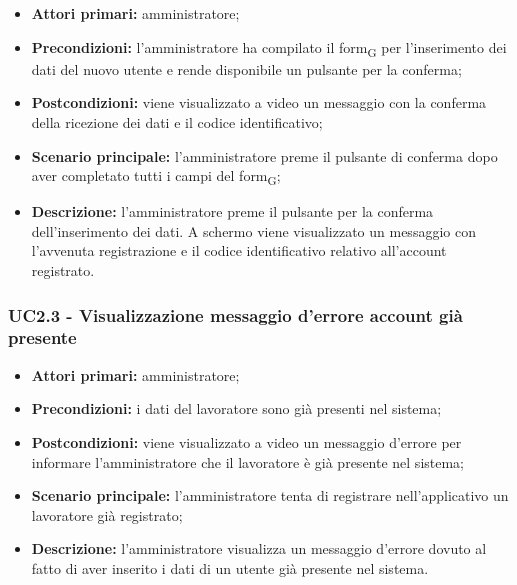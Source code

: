 \begin{itemize}
	\item 	\textbf{Attori primari:} amministratore;
	\item 	\textbf{Precondizioni:} l'amministratore ha compilato il form\textsubscript{G} per l'inserimento dei dati del nuovo utente e rende disponibile un pulsante per la conferma;
	\item 	\textbf{Postcondizioni:} viene visualizzato a video un messaggio con la conferma della ricezione dei dati e il codice identificativo;
	\item 	\textbf{Scenario principale:} l'amministratore preme il pulsante di conferma dopo aver completato tutti i campi del form\textsubscript{G};
	\item 	\textbf{Descrizione:} l'amministratore preme il pulsante per la conferma dell'inserimento dei dati. A schermo viene visualizzato un messaggio con l'avvenuta registrazione e il codice identificativo relativo all'account registrato.

\end{itemize}

\subsubsection{UC2.3 - Visualizzazione messaggio d'errore account già presente}

\begin{itemize}
	\item 	\textbf{Attori primari:} amministratore;
	\item 	\textbf{Precondizioni:} i dati del lavoratore sono già presenti nel sistema;
	\item 	\textbf{Postcondizioni:} viene visualizzato a video un messaggio d'errore per informare l'amministratore che il lavoratore è già presente nel sistema;
	\item 	\textbf{Scenario principale:} l'amministratore tenta di registrare nell'applicativo un lavoratore già registrato;
	\item 	\textbf{Descrizione:} l'amministratore visualizza un messaggio d'errore dovuto al fatto di aver inserito i dati di un utente già presente nel sistema.
\end{itemize}

